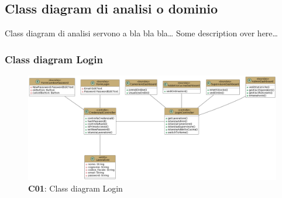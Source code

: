 \subsection{Class diagram di analisi o dominio}

    \begin{flushleft}
        Class diagram di analisi servono a bla bla bla\ldots
        Some description over here\ldots
    \end{flushleft}

    \subsubsection{Class diagram Login}
        \begin{figure}[H]
            \centering
            \includegraphics[scale=0.5]{assets/diagrammi/Class diagram di analisi/Gestione Login.png}
            \caption{\textbf{C01}: Class diagram Login}\label{fig:Login}
        \end{figure}


